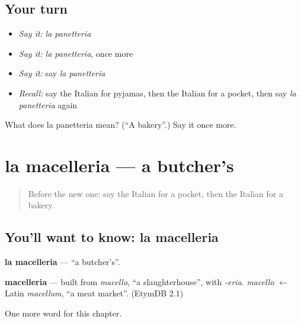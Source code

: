 \subsection*{Your turn}
\begin{itemize}
\raggedright
  \item \emph{Say it:} \emph{la panetteria}
  \item \emph{Say it:} \emph{la panetteria}, once more
  \item \emph{Say it:} say \emph{la panetteria}
  \item \emph{Recall:} say the Italian for pyjamas, then the Italian for a pocket, then say \emph{la panetteria} again
\end{itemize}

\begin{tcolorbox}[breakable,colback=teal!4,colframe=teal!35!black,title={Before you move on}]
What does la panetteria mean? (\textquotedblleft{}A bakery\textquotedblright{}.) Say it once more.
\end{tcolorbox}
\section[la macelleria]{la macelleria — a butcher's}

\label{lesson:IT-C221-macelleria}



\begin{quote}
Before the new one: say the Italian for a pocket, then the Italian for a bakery.
\end{quote}

\subsection*{You'll want to know: la macelleria}
\textbf{la macelleria} — \textquotedblleft{}a butcher's\textquotedblright{}.

\begin{cousinweb}
\textbf{macelleria} — built from \emph{macello}, \textquotedblleft{}a slaughterhouse\textquotedblright{}, with \emph{-eria}. \emph{macello} $\leftarrow$ Latin \emph{macellum}, \textquotedblleft{}a meat market\textquotedblright{}. (EtymDB 2.1)
\end{cousinweb}

\begin{grammarlens}[title={What you've built}]
One more word for this chapter.
\end{grammarlens}

